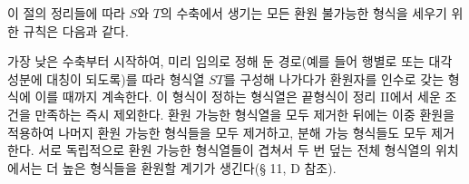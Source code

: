 
이 절의 정리들에 따라 $S$와 $T$의 수축에서 생기는 모든 환원 불가능한 형식을 세우기 위한 규칙은 다음과 같다.

가장 낮은 수축부터 시작하여, 미리 임의로 정해 둔 경로(예를 들어 행별로 또는 대각 성분에 대칭이 되도록)를 따라 형식열 $ST$를 구성해 나가다가 환원자를 인수로 갖는 형식에 이를 때까지 계속한다. 이 형식이 정하는 형식열은 끝형식이 정리 II에서 세운 조건을 만족하는 즉시 제외한다. 환원 가능한 형식열을 모두 제거한 뒤에는 이중 환원을 적용하여 나머지 환원 가능한 형식들을 모두 제거하고, 분해 가능 형식들도 모두 제거한다. 서로 독립적으로 환원 가능한 형식열들이 겹쳐서 두 번 덮는 전체 형식열의 위치에서는 더 높은 형식들을 환원할 계기가 생긴다(§ 11, D 참조).
